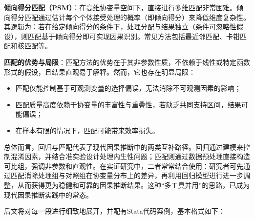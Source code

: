 \textbf{倾向得分匹配（PSM）}：在高维协变量空间下，直接进行多维匹配非常困难。倾向得分匹配通过估计每个个体接受处理的概率（即倾向得分）来降低维度复杂性。其逻辑为：若在给定倾向得分的条件下，处理分配与结果独立（条件可忽略性假设），则匹配基于倾向得分即可实现因果识别。常见方法包括最近邻匹配、卡钳匹配和核匹配等。

\textbf{匹配的优势与局限}：匹配方法的优势在于其非参数性质，不依赖于线性或特定函数形式的假设，且结果直观易于解释。然而，它也存在明显局限：  
\begin{itemize}
    \item 匹配仅能控制基于可观测变量的选择偏误，无法消除不可观测因素的影响；
    \item 匹配质量高度依赖于协变量的丰富性与重叠性，若缺乏共同支持区间，结果可能偏误；
    \item 在样本有限的情况下，匹配可能带来效率损失。
\end{itemize}

总体而言，回归与匹配代表了现代因果推断中的两类互补路径。回归通过建模来控制混淆因素，并结合准实验设计处理内生性问题；匹配则通过数据预处理直接构造可比组，强调非参数和直观性。在实证研究中，二者常常结合使用：研究者可先通过匹配消除处理组与对照组在协变量分布上的差异，再利用回归模型进行进一步调整，从而获得更为稳健和可靠的因果推断结果。这种“多工具并用”的思路，已成为现代因果推断实践中的常态。

后文将对每一段进行细致地展开，并配有Stata代码案例，基本格式如下：

